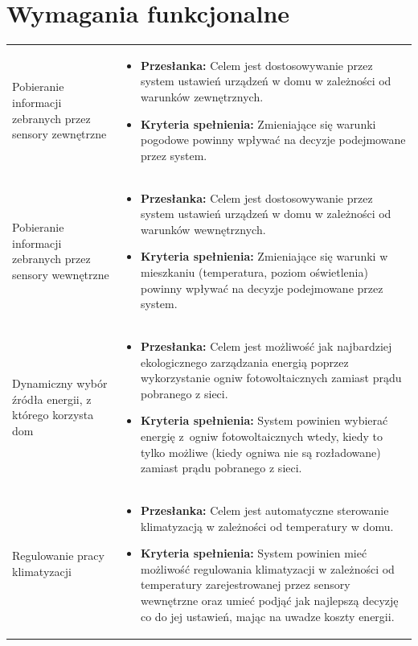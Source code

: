 \documentclass{article}
\begin{document}
\section{Wymagania funkcjonalne}
\begin{center}
{\def\arraystretch{3}\tabcolsep=5pt
	\begin{longtable}{p{5cm}p{10cm}}
	
	Pobieranie informacji zebranych przez sensory zewnętrzne&
	\begin{itemize}
	\item \textbf{Przesłanka:} Celem jest dostosowywanie przez system ustawień urządzeń w domu w zależności od warunków zewnętrznych.
	\item \textbf{Kryteria spełnienia:} Zmieniające się warunki pogodowe powinny wpływać na decyzje podejmowane przez system.
	\end{itemize}\\
	
	Pobieranie informacji zebranych przez sensory wewnętrzne&
	\begin{itemize}
	\item \textbf{Przesłanka:} Celem jest dostosowywanie przez system ustawień urządzeń w domu w zależności od warunków wewnętrznych.
	\item \textbf{Kryteria spełnienia:} Zmieniające się warunki w mieszkaniu (temperatura, poziom oświetlenia) powinny wpływać na decyzje podejmowane przez system.
	\end{itemize}\\
	
	Dynamiczny wybór źródła energii, z którego korzysta dom&
	\begin{itemize}
	\item \textbf{Przesłanka:} Celem jest możliwość jak najbardziej ekologicznego zarządzania energią poprzez wykorzystanie ogniw fotowoltaicznych zamiast prądu pobranego z sieci.
	\item \textbf{Kryteria spełnienia:} System powinien wybierać energię z~ogniw fotowoltaicznych wtedy, kiedy to tylko możliwe (kiedy ogniwa nie są rozładowane) zamiast prądu pobranego z sieci.
	\end{itemize}\\
	
	Regulowanie pracy klimatyzacji&
	\begin{itemize}
	\item \textbf{Przesłanka:} Celem jest automatyczne sterowanie klimatyzacją w zależności od temperatury w domu.
	\item \textbf{Kryteria spełnienia:} System powinien mieć możliwość regulowania klimatyzacji w zależności od temperatury zarejestrowanej przez sensory wewnętrzne oraz umieć podjąć jak najlepszą decyzję co do jej ustawień, mając na uwadze koszty energii.
	\end{itemize}\\
	

\end{longtable}}
\end{center}
\end{document}
